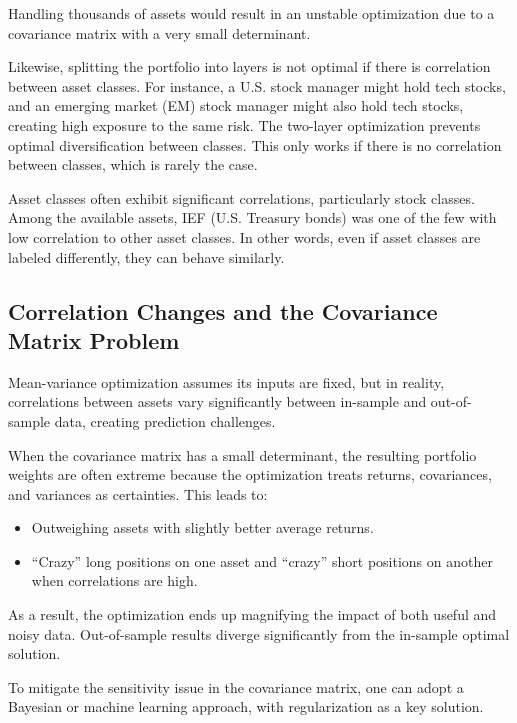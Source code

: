 \documentclass{article}
\begin{document}
Handling thousands of assets would result in an unstable optimization
due to a covariance matrix with a very small determinant.

Likewise, splitting the portfolio into layers is not optimal if there is
correlation between asset classes. For instance, a U.S. stock manager
might hold tech stocks, and an emerging market (EM) stock manager might
also hold tech stocks, creating high exposure to the same risk. The
two-layer optimization prevents optimal diversification between classes.
This only works if there is no correlation between classes, which is
rarely the case.

Asset classes often exhibit significant correlations, particularly stock
classes. Among the available assets, IEF (U.S. Treasury bonds) was one
of the few with low correlation to other asset classes. In other words,
even if asset classes are labeled differently, they can behave
similarly.

\hypertarget{correlation-changes-and-the-covariance-matrix-problem}{%
\subsection{Correlation Changes and the Covariance Matrix
Problem}\label{correlation-changes-and-the-covariance-matrix-problem}}

Mean-variance optimization assumes its inputs are fixed, but in reality,
correlations between assets vary significantly between in-sample and
out-of-sample data, creating prediction challenges.

When the covariance matrix has a small determinant, the resulting
portfolio weights are often extreme because the optimization treats
returns, covariances, and variances as certainties. This leads to:
\begin{itemize}
    \item Outweighing assets with slightly better average returns.
    \item ``Crazy''
    long positions on one asset and ``crazy'' short positions on another
    when correlations are high.
\end{itemize}

As a result, the optimization ends up magnifying the impact of both
useful and noisy data. Out-of-sample results diverge significantly from
the in-sample optimal solution.

To mitigate the sensitivity issue in the covariance matrix, one can
adopt a Bayesian or machine learning approach, with regularization as a
key solution.
\end{document}
